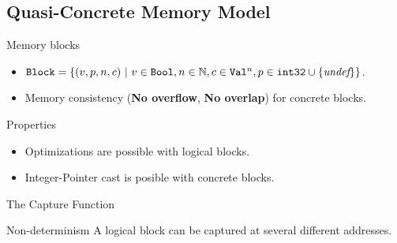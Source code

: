 \subsection{Quasi-Concrete Memory Model}
\begin{frame}{\subsecname}

  \begin{block}{Memory blocks}
    \begin{itemize}
    \item $\texttt{Block}=\{(v,p,n,c)~|~v\in\texttt{Bool},n\in\mathbb{N},c\in\texttt{Val}^{n},p\in\texttt{int32}\cup\{\textit{undef}\}\}$.
    \item Memory consistency (\textbf{No overflow}, \textbf{No overlap}) for concrete blocks.
    \end{itemize}
  \end{block}
  \vfill
  \begin{exampleblock}{Properties}
    \begin{itemize}
    \item Optimizations are possible with logical blocks.
    \item Integer-Pointer cast is posible with concrete blocks.
    \end{itemize}
  \end{exampleblock}
  
\end{frame}

\begin{frame}{The Capture Function}

  \begin{minipage}{0.48\textwidth}
    
  \end{minipage}
  \begin{minipage}{0.48\textwidth}
    
  \end{minipage}
  \vfill
  \begin{alertblock}{Non-determinism}
    A logical block can be captured at several different addresses.
  \end{alertblock}
  
\end{frame}

